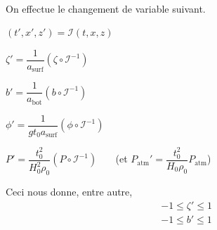 \documentclass[12pt,a4paper]{article}
\numberwithin{equation}{section}
\begin{document}
    
   
    


~\\

On effectue le changement de variable suivant.

\begin{list}{\textbullet}{}
    \item $(t',x',z') = \mathcal{I} (t,x,z)$
    \item $\zeta' = \dfrac{1}{a_{\text{surf}}}(\zeta \circ \mathcal{I}^{-1})$ 
    \item $b' = \dfrac{1}{a_{\text{bot}}}(b\circ\mathcal{I}^{-1})$
     \item $\phi' = \dfrac{1}{g t_0 a_{\text{surf}}}(\phi \circ \mathcal{I}^{-1})$
     \item $P' = \dfrac{t_0^2}{H_0^2\rho_0} (P \circ \mathcal{I}^{-1})~~~~~~~$   (et $P_{\text{atm}}' = \dfrac{t_0^2}{H_0\rho_0} P_\text{atm}$)
\end{list}

Ceci nous donne, entre autre, 
\begin{align}
    &-1 \leq \zeta' \leq 1\\ &-1 \leq b' \leq 1 
\end{align}
\end{document}
